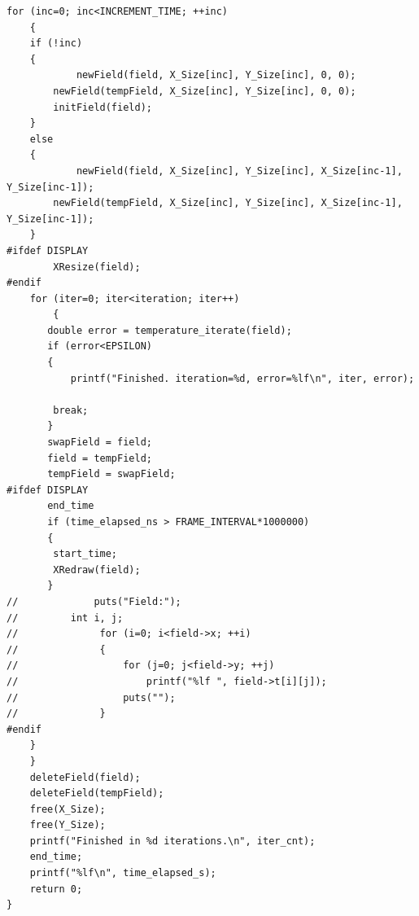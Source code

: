 \documentclass{acm_proc_article-sp}
\begin{document}
\begin{lstlisting}[caption=main\_openmp\_increment.h]
    for (inc=0; inc<INCREMENT_TIME; ++inc)
    {	
	if (!inc)
	{
            newField(field, X_Size[inc], Y_Size[inc], 0, 0);
	    newField(tempField, X_Size[inc], Y_Size[inc], 0, 0);	    
	    initField(field);
	}
	else 
	{
            newField(field, X_Size[inc], Y_Size[inc], X_Size[inc-1], Y_Size[inc-1]);
	    newField(tempField, X_Size[inc], Y_Size[inc], X_Size[inc-1], Y_Size[inc-1]);
	}
#ifdef DISPLAY
        XResize(field);
#endif
	for (iter=0; iter<iteration; iter++)
        {
	   double error = temperature_iterate(field);
	   if (error<EPSILON)
	   {
		   printf("Finished. iteration=%d, error=%lf\n", iter, error);

		break;
	   }
	   swapField = field;
	   field = tempField;
	   tempField = swapField;
#ifdef DISPLAY
	   end_time
	   if (time_elapsed_ns > FRAME_INTERVAL*1000000)
	   {
		start_time;
		XRedraw(field);
	   } 	   
//	    	   puts("Field:");
//		   int i, j;
//        	    for (i=0; i<field->x; ++i)
//        	    {
//        		    for (j=0; j<field->y; ++j)
//        		    	printf("%lf ", field->t[i][j]);
//        		    puts("");
//        	    }
#endif	
	}
    }
    deleteField(field);
    deleteField(tempField);
    free(X_Size);
    free(Y_Size);
    printf("Finished in %d iterations.\n", iter_cnt);
    end_time;
    printf("%lf\n", time_elapsed_s);
    return 0;
}

\end{lstlisting}
\end{document}
